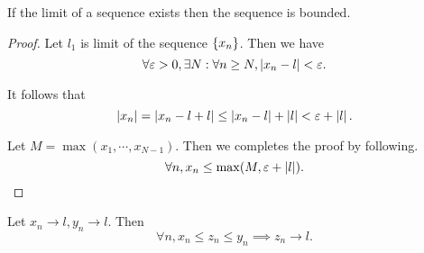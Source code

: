 
\begin{theorem}
  \label{thm:limit_bound}
  If the limit of a sequence exists then the sequence is bounded.
\end{theorem}

\begin{proof}
  Let $l_1$ is limit of the sequence $\{x_n\}$. Then we have
  \begin{equation}
    \forall \varepsilon > 0, \exists N: \forall n \ge N, \left| x_n - l \right| < \varepsilon.
  \end{equation}

  It follows that
  \begin{equation}
    \left| x_n \right| = \left| x_n - l + l \right| \le \left| x_n - l \right| + \left| l \right| < \varepsilon + \left| l \right|.
  \end{equation}

  Let $M = \max (x_1, \cdots, x_{N-1})$. Then we completes the proof by
  following.
  \begin{equation}
    \forall n, x_n \le \max (M, \varepsilon + \left| l \right|).
  \end{equation}
\end{proof}







\begin{theorem}
  \label{thm:limit_squeeze}
  Let $x_n \to l, y_n \to l$. Then
  \begin{equation}
    \forall n, x_n \le z_n \le y_n \implies z_n \to l.
  \end{equation}
\end{theorem}


